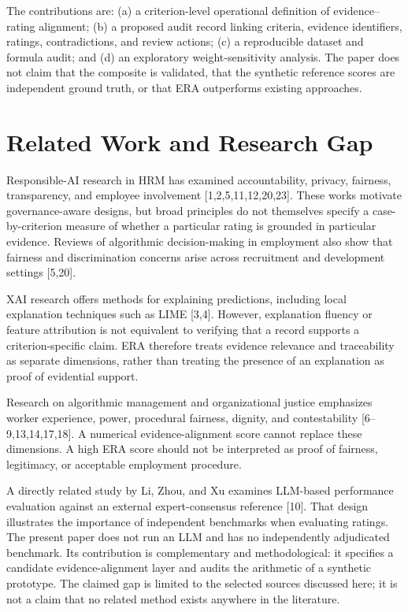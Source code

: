 \documentclass[
  10pt,
  runningheads]{llncs}
\begin{document}
The contributions are: (a) a criterion-level operational definition of
evidence--rating alignment; (b) a proposed audit record linking
criteria, evidence identifiers, ratings, contradictions, and review
actions; (c) a reproducible dataset and formula audit; and (d) an
exploratory weight-sensitivity analysis. The paper does not claim that
the composite is validated, that the synthetic reference scores are
independent ground truth, or that ERA outperforms existing approaches.

\section{Related Work and Research
Gap}\label{related-work-and-research-gap}

Responsible-AI research in HRM has examined accountability, privacy,
fairness, transparency, and employee involvement
{[}1,2,5,11,12,20,23{]}. These works motivate governance-aware designs,
but broad principles do not themselves specify a case-by-criterion
measure of whether a particular rating is grounded in particular
evidence. Reviews of algorithmic decision-making in employment also show
that fairness and discrimination concerns arise across recruitment and
development settings {[}5,20{]}.

XAI research offers methods for explaining predictions, including local
explanation techniques such as LIME {[}3,4{]}. However, explanation
fluency or feature attribution is not equivalent to verifying that a
record supports a criterion-specific claim. ERA therefore treats
evidence relevance and traceability as separate dimensions, rather than
treating the presence of an explanation as proof of evidential support.

Research on algorithmic management and organizational justice emphasizes
worker experience, power, procedural fairness, dignity, and
contestability {[}6--9,13,14,17,18{]}. A numerical evidence-alignment
score cannot replace these dimensions. A high ERA score should not be
interpreted as proof of fairness, legitimacy, or acceptable employment
procedure.

A directly related study by Li, Zhou, and Xu examines LLM-based
performance evaluation against an external expert-consensus reference
{[}10{]}. That design illustrates the importance of independent
benchmarks when evaluating ratings. The present paper does not run an
LLM and has no independently adjudicated benchmark. Its contribution is
complementary and methodological: it specifies a candidate
evidence-alignment layer and audits the arithmetic of a synthetic
prototype. The claimed gap is limited to the selected sources discussed
here; it is not a claim that no related method exists anywhere in the
literature.
\end{document}
